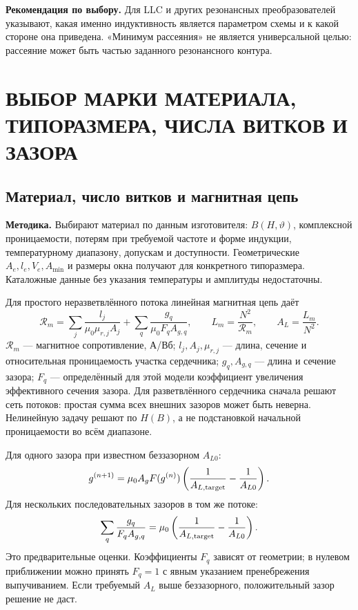 \documentclass[14pt,a4paper]{extarticle}
\newcommand{\method}{\par\noindent\textbf{Методика.} }
\newcommand{\recommend}{\par\noindent\textbf{Рекомендация по выбору.} }
\begin{document}
\recommend Для LLC и других резонансных преобразователей указывают, какая именно индуктивность является параметром схемы и к какой стороне она приведена. «Минимум рассеяния» не является универсальной целью: рассеяние может быть частью заданного резонансного контура.\cite{web1}

\section{ВЫБОР МАРКИ МАТЕРИАЛА, ТИПОРАЗМЕРА, ЧИСЛА ВИТКОВ И ЗАЗОРА}
\label{pl:core}

\subsection{Материал, число витков и магнитная цепь}
\method Выбирают материал по данным изготовителя: $B(H,\vartheta)$, комплексной проницаемости, потерям при требуемой частоте и форме индукции, температурному диапазону, допускам и доступности. Геометрические $A_e,l_e,V_e,A_{\min}$ и размеры окна получают для конкретного типоразмера. Каталожные данные без указания температуры и амплитуды недостаточны.\cite{web3}

Для простого неразветвлённого потока линейная магнитная цепь даёт
\begin{equation}
 \mathcal R_m=\sum_j\frac{l_j}{\mu_0\mu_{r,j}A_j}
 +\sum_q\frac{g_q}{\mu_0F_q A_{g,q}},\qquad
 L_m=\frac{N^2}{\mathcal R_m},\qquad A_L=\frac{L_m}{N^2}.
 \label{eq:magnetic-circuit}
\end{equation}
$\mathcal R_m$ --- магнитное сопротивление, А/Вб; $l_j,A_j,\mu_{r,j}$ --- длина, сечение и относительная проницаемость участка сердечника; $g_q,A_{g,q}$ --- длина и сечение зазора; $F_q$ --- определённый для этой модели коэффициент увеличения эффективного сечения зазора. Для разветвлённого сердечника сначала решают сеть потоков: простая сумма всех внешних зазоров может быть неверна. Нелинейную задачу решают по $H(B)$, а не подстановкой начальной проницаемости во всём диапазоне.

Для одного зазора при известном беззазорном $A_{L0}$:
\begin{equation}
 g^{(n+1)}=\mu_0 A_g F(g^{(n)})
 \left(\frac1{A_{L,\rm target}}-\frac1{A_{L0}}\right).
 \label{eq:gap-fringing}
\end{equation}
Для нескольких последовательных зазоров в том же потоке:
\begin{equation}
 \sum_q\frac{g_q}{F_q A_{g,q}}=
 \mu_0\left(\frac1{A_{L,\rm target}}-\frac1{A_{L0}}\right).
 \label{eq:multiple-gap-balance}
\end{equation}
Это предварительные оценки. Коэффициенты $F_q$ зависят от геометрии; в нулевом приближении можно принять $F_q=1$ с явным указанием пренебрежения выпучиванием. Если требуемый $A_L$ выше беззазорного, положительный зазор решение не даст.
\end{document}
